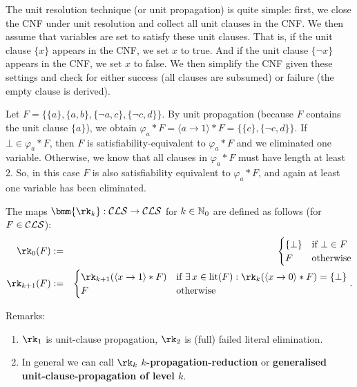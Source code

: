 \documentclass[]{book}
\begin{document}
The unit resolution technique (or unit propagation) is quite simple: first, we close the CNF under unit resolution and collect all unit 
clauses in the CNF. We then assume that variables are set to satisfy these unit clauses. That is, if the unit clause $\{x\}$ appears 
in the CNF, we set $x$ to true. And if the unit clause $\{\neg x\}$ appears in the CNF, we set $x$ to false. We then simplify the 
CNF given these settings and check for either success (all clauses are subsumed) or failure (the empty clause is derived)\cite{h6}.

\begin{examp}\label{exp:unit1}
      Let $F=\{ \{a\}, \{a, b\}, \{\neg a, c\}, \{\neg c, d\}\}$. By unit propagation (because $F$ contains the unit clause $\{a\}$), 
	  we obtain $\varphi_a * F=\langle a \rightarrow 1 \rangle * F= \{ \{c\}, \{\neg c, d\}\}$. If $\bot \in \varphi_a * F$, then $F$ is 
	  satisfiability-equivalent to $\varphi_a * F$ and we eliminated one variable. Otherwise, we know that all clauses in $\varphi_a * F$ 
	  must have length at least 2. So, in this case $F$ is also satisfiability equivalent to $\varphi_a * F$, and again at least one 
	  variable has been eliminated.
\end{examp}

\begin{defi}\label{def:rk}
  The maps $\bmm{\rk_k}: \Cls \ra \Cls$ for $k \in \mathbb{N}_0$ are defined as follows (for $F \in \mathcal{CLS}$):
  \begin{eqnarray*}
    \rk_0(F) & := &
    \begin{cases}
      \set{\bot} & \text{if } \bot \in F\\
      F & \text{otherwise}
    \end{cases}\\
    \rk_{k+1}(F) & := &
    \begin{cases}
      \rk_{k+1}(\pao x1 * F) & \text{if } \ex\, x \in \lit(F) : \rk_k(\pao x0 * F) = \set{\bot}\\
      F & \text{otherwise}
    \end{cases}.
  \end{eqnarray*}
\end{defi}
Remarks:
\begin{enumerate}
\item $\rk_1$ is unit-clause propagation, $\rk_2$ is (full) failed literal elimination.
\item In general we can call $\rk_k$ \textbf{$k$-propagation-reduction} or \textbf{generalised unit-clause-propagation of level $k$}.
\end{enumerate}
\end{document}
